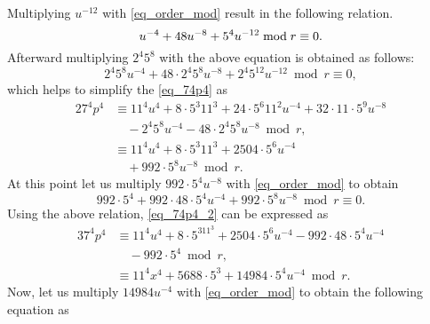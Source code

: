 Multiplying $u^{-12}$ with \eqref{eq_order_mod} result in the following relation.
\begin{equation}
u^{-4}+48u^{-8}+5^4u^{-12} \bmod r  \equiv   0 \nonumber. \\
\end{equation}
Afterward multiplying $2^4 5^{8}$ with the above equation is obtained as follows:
\begin{equation}
2^4 5^{8}u^{-4}+ 48 \cdot  2^4 5^{8}u^{-8}+  2^4 5^{12} u^{-12} \bmod r \equiv   0 \nonumber,
\end{equation}
which helps to simplify the \eqref{eq_74p4} as 
\begin{alignat}{2}
7^4p^4 &\equiv  11^4u^4 + 8\cdot 5^3 11^3 + 24 \cdot 5^6 11^2 u^{-4} +  32 \cdot 11 \cdot 5^9 u^{-8} \nonumber \\
& \quad   - 2^4  5^{8}u^{-4} - 48 \cdot 2^4 5^{8}u^{-8}\bmod r, \nonumber \\
& \equiv 11^4u^4+ 8 \cdot 5^3  11^3+2504 \cdot 5^6u^{-4}  \nonumber \\
& \quad + 992 \cdot 5^8 u^{-8} \bmod r. \label{eq_74p4_2}
\end{alignat}
At this point let us multiply $992 \cdot 5^4u^{-8}$  with \eqref{eq_order_mod} to obtain
\begin{equation}
992 \cdot 5^4 +  992 \cdot 48 \cdot  5^4 u^{-4}+ 992 \cdot 5^8u^{-8} \bmod r  \equiv   0. \nonumber
\end{equation}
Using the above relation, \eqref{eq_74p4_2} can be expressed as  
\begin{alignat}{3}
7^4p^4 & \equiv  11^4u^4+ 8 \cdot 5^311^3+2504 \cdot 5^6u^{-4} - 992 \cdot48 \cdot 5^4 u^{-4}  \nonumber \\
& \quad -992 \cdot 5^4 \bmod r,  \nonumber \\
& \equiv  11^4x^4+5688 \cdot 5^3 +14984 \cdot 5^4 u^{-4} \bmod r. \label{eq_74p4_3} 
\end{alignat}
Now, let us multiply $14984u^{-4}$ with \eqref{eq_order_mod} to obtain the following equation as

